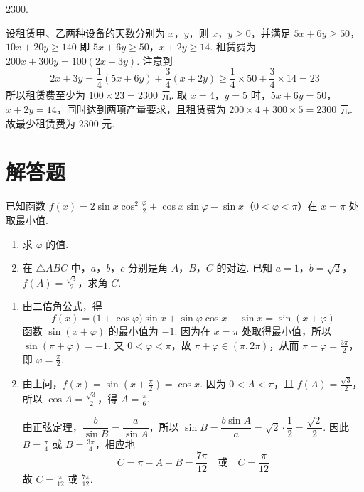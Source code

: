 \begin{answer}
\(2300\).
\end{answer}

\begin{solution}
设租赁甲、乙两种设备的天数分别为 \(x\)，\(y\)，则 \(x\)，\(y\geqslant0\)，并满足
\(5x+6y\geqslant50\)，\(10x+20y\geqslant140\)
即
\(5x+6y\geqslant50\)，\(x+2y\geqslant14\).
租赁费为 \(200x+300y=100(2x+3y)\). 注意到
\[
2x+3y=\frac14(5x+6y)+\frac34(x+2y)
\geqslant\frac14\times50+\frac34\times14=23
\]
所以租赁费至少为 \(100\times23=2300\) 元. 取 \(x=4\)，\(y=5\) 时，\(5x+6y=50\)，\(x+2y=14\)，同时达到两项产量要求，且租赁费为 \(200\times4+300\times5=2300\) 元.
故最少租赁费为 \(2300\) 元.
\end{solution}

\section{解答题}

\begin{problem}
已知函数 \(f(x) = 2\sin x\cos^2\frac{\varphi}{2} + \cos x\sin \varphi - \sin x\)（\(0 < \varphi < \pi\)）在 \(x = \pi\) 处取最小值.

\begin{enumerate}
\item 求 \(\varphi\) 的值.
\item 在 \(\triangle ABC\) 中，\(a\)，\(b\)，\(c\) 分别是角 \(A\)，\(B\)，\(C\) 的对边. 已知 \(a = 1\)，\(b = \sqrt{2}\)，\(f(A) = \frac{\sqrt{3}}{2}\)，求角 \(C\).
\end{enumerate}
\end{problem}

\begin{solution}
\begin{enumerate}
\item 由二倍角公式，得
\[
f(x)=\bigl(1+\cos\varphi\bigr)\sin x+\sin\varphi\cos x-\sin x=\sin(x+\varphi)
\]
函数 \(\sin(x+\varphi)\) 的最小值为 \(-1\). 因为在 \(x=\pi\) 处取得最小值，所以 \(\sin(\pi+\varphi)=-1\). 又 \(0<\varphi<\pi\)，故 \(\pi+\varphi\in(\pi,2\pi)\)，从而 \(\pi+\varphi=\frac{3\pi}{2}\)，即 \(\varphi=\frac{\pi}{2}\).

\item 由上问，\(f(x)=\sin\left(x+\frac{\pi}{2}\right)=\cos x\). 因为 \(0<A<\pi\)，且 \(f(A)=\frac{\sqrt{3}}{2}\)，所以 \(\cos A=\frac{\sqrt{3}}{2}\)，得 \(A=\frac{\pi}{6}\).

由正弦定理，\(\dfrac{b}{\sin B}=\dfrac{a}{\sin A}\)，所以 \(\sin B=\dfrac{b\sin A}{a}=\sqrt{2}\cdot\dfrac{1}{2}=\dfrac{\sqrt{2}}{2}\). 因此 \(B=\frac{\pi}{4}\) 或 \(B=\frac{3\pi}{4}\)，相应地
\[
C=\pi-A-B=\frac{7\pi}{12}\quad\text{或}\quad C=\frac{\pi}{12}
\]
故 \(C=\frac{\pi}{12}\) 或 \(\frac{7\pi}{12}\).
\end{enumerate}
\end{solution}

